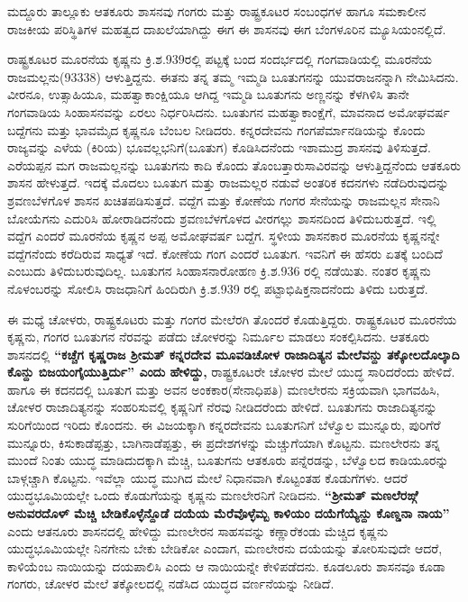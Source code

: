 ಮದ್ದೂರು ತಾಲ್ಲೂಕು ಆತಕೂರು ಶಾಸನವು ಗಂಗರು ಮತ್ತು ರಾಷ್ಟ್ರಕೂಟರ ಸಂಬಂಧಗಳ ಹಾಗೂ ಸಮಕಾಲೀನ ರಾಜಕೀಯ ಪರಿಸ್ಥಿತಿಗಳ ಮಹತ್ವದ ದಾಖಲೆಯಾಗಿದ್ದು ಈಗ ಈ ಶಾಸನವು ಈಗ ಬೆಂಗಳೂರಿನ ಮ್ಯೂಸಿಯಂನಲ್ಲಿದೆ.

ರಾಷ್ಟ್ರಕೂಟರ ಮೂರನೆಯ ಕೃಷ್ಣನು ಕ್ರಿ.ಶ.939ರಲ್ಲಿ ಪಟ್ಟಕ್ಕೆ ಬಂದ ಸಂದರ್ಭದಲ್ಲಿ ಗಂಗವಾಡಿಯಲ್ಲಿ ಮೂರನೆಯ ರಾಜಮಲ್ಲನು(933\enginline{-}38) ಆಳುತ್ತಿದ್ದನು. ಈತನು ತನ್ನ ತಮ್ಮ ಇಮ್ಮಡಿ ಬೂತುಗನನ್ನು ಯುವರಾಜನನ್ನಾಗಿ ನೇಮಿಸಿದನು. ವೀರನೂ, ಉತ್ಸಾಹಿಯೂ, ಮಹತ್ವಾಕಾಂಕ್ಷಿಯೂ ಆಗಿದ್ದ ಇಮ್ಮಡಿ ಬೂತುಗನು ಅಣ್ಣನನ್ನು ಕೆಳಗಿಳಿಸಿ ತಾನೇ ಗಂಗವಾಡಿಯ ಸಿಂಹಾಸನವನ್ನು ಏರಲು ನಿರ್ಧರಿಸಿದನು. ಬೂತುಗನ ಮಹತ್ವಾಕಾಂಕ್ಷೆಗೆ, ಮಾವನಾದ ಅಮೋಘವರ್ಷ ಬದ್ದೆಗನು ಮತ್ತು ಭಾವಮೈದ ಕೃಷ್ಣನೂ ಬೆಂಬಲ ನೀಡಿದರು. ಕನ್ನರದೇವನು ಗಂಗಪೆರ್ಮಾನಡಿಯನ್ನು ಕೊಂದು ರಾಜ್ಯವನ್ನು ಎಳೆಯ (ಕಿರಿಯ) ಭೂವಲ್ಲಭನಿಗೆ(ಬೂತುಗ) ಕೊಡಿಸಿದನೆಂದು ಇಶಾಮುದ್ರ ಶಾಸನವು ತಿಳಿಸುತ್ತದೆ. ಎರೆಯಪ್ಪನ ಮಗ ರಾಜಮಲ್ಲನನ್ನು ಬೂತುಗನು ಕಾದಿ ಕೊಂದು ತೊಂಬತ್ತಾರುಸಾವಿರವನ್ನು ಆಳುತ್ತಿದ್ದನೆಂದು ಆತಕೂರು ಶಾಸನ ಹೇಳುತ್ತದೆ. ಇದಕ್ಕೆ ಮೊದಲು ಬೂತುಗ ಮತ್ತು ರಾಜಮಲ್ಲರ ನಡುವೆ ಅಂತರಿಕ ಕದನಗಳು ನಡೆದಿರುವುದನ್ನು ಶ್ರವಣಬೆಳಗೊಳ ಶಾಸನ ಖಚಿತಪಡಿಸುತ್ತದೆ. ವದ್ದೆಗ ಮತ್ತು ಕೋಣೆಯ ಗಂಗರ ಸೇನೆಯನ್ನು ರಾಜಮಲ್ಲನ ಸೇನಾನಿ ಬೋಯೆಗನು ಎದುರಿಸಿ ಹೋರಾಡಿದನೆಂದು ಶ್ರವಣಬೆಳಗೊಳದ ವೀರಗಲ್ಲು ಶಾಸನದಿಂದ ತಿಳಿದುಬರುತ್ತದೆ. ಇಲ್ಲಿ ವದ್ದೆಗ ಎಂದರೆ ಮೂರನೆಯ ಕೃಷ್ಣನ ಅಪ್ಪ ಅಮೋಘವರ್ಷ ಬದ್ದೆಗ. ಸ್ಥಳೀಯ ಶಾಸನಕಾರ ಮೂರನೆಯ ಕೃಷ್ಣನನ್ನೇ ವದ್ದೆಗನೆಂದು ಕರೆದಿರುವ ಸಾಧ್ಯತೆ ಇದೆ. ಕೋಣೆಯ ಗಂಗ ಎಂದರೆ ಬೂತುಗ. ಇವನಿಗೆ ಈ ಹೆಸರು ಏತಕ್ಕೆ ಬಂದಿದೆ ಎಂಬುದು ತಿಳಿದುಬರುವುದಿಲ್ಲ. ಬೂತುಗನ ಸಿಂಹಾಸನಾರೋಹಣ ಕ್ರಿ.ಶ.936 ರಲ್ಲಿ ನಡೆಯಿತು. ನಂತರ ಕೃಷ್ಣನು ನೊಳಂಬರನ್ನು ಸೋಲಿಸಿ ರಾಜಧಾನಿಗೆ ಹಿಂದಿರುಗಿ ಕ್ರಿ.ಶ.939 ರಲ್ಲಿ ಪಟ್ಟಾಭಿಷಿಕ್ತನಾದನೆಂದು ತಿಳಿದು ಬರುತ್ತದೆ.

ಈ ಮಧ್ಯೆ ಚೋಳರು, ರಾಷ್ಟ್ರಕೂಟರು ಮತ್ತು ಗಂಗರ ಮೇಲೆರಗಿ ತೊಂದರೆ ಕೊಡುತ್ತಿದ್ದರು. ರಾಷ್ಟ್ರಕೂಟರ ಮೂರನೆಯ ಕೃಷ್ಣನು, ಗಂಗರ ಬೂತುಗನ ನೆರವನ್ನು ಪಡೆದು ಚೋಳರನ್ನು ನಿರ್ಮೂಲ ಮಾಡಲು ಸಂಕಲ್ಪಿಸಿದನು. ಆತಕೂರು ಶಾಸನದಲ್ಲಿ \textbf{“ಕಚ್ಚೆಗ ಕೃಷ್ಣರಾಜ ಶ‍್ರೀಮತ್​ ಕನ್ನರದೇವ ಮೂವಡಿಚೋಳ ರಾಜಾದಿತ್ಯನ ಮೇಲೆವನ್ದು ತಕ್ಕೋಲದೊಲ್ಕಾದಿ ಕೊನ್ದು ಬಿಜಯಂಗೈಯುತ್ತಿರ್ದು” ಎಂದು ಹೇಳಿದ್ದು, }ರಾಷ್ಟ್ರಕೂಟರೇ ಚೋಳರ ಮೇಲೆ ಯುದ್ಧ ಸಾರಿದರೆಂದು ಹೇಳಿದೆ. ಹಾಗೂ ಈ ಕದನದಲ್ಲಿ ಬೂತುಗ ಮತ್ತು ಅವನ ಅಂಕಕಾರ(ಸೇನಾಧಿಪತಿ) ಮಣಲೇರನು ಸಕ್ರಿಯವಾಗಿ ಭಾಗವಹಿಸಿ, ಚೋಳರ ರಾಜಾದಿತ್ಯನನ್ನು ಸಂಹರಿಸುವಲ್ಲಿ ಕೃಷ್ಣನಿಗೆ ನೆರವು ನೀಡಿದರೆಂದು ಹೇಳಿದೆ. ಬೂತುಗನು ರಾಜಾದಿತ್ಯನನ್ನು ಸುರಿಗೆಯಿಂದ ಇರಿದು ಕೊಂದನು. ಈ ವಿಜಯಕ್ಕಾಗಿ ಕನ್ನರದೇವನು ಬೂತುಗನಿಗೆ ಬೆಳ್ವೊಲ ಮುನ್ನೂರು, ಪುರಿಗೆರೆ ಮುನ್ನೂರು, ಕಿಸುಕಾಡೆಪ್ಪತ್ತು, ಬಾಗಿನಾಡೆಪ್ಪತ್ತು, ಈ ಪ್ರದೇಶಗಳನ್ನು ಮೆಚ್ಚುಗೆಯಾಗಿ ಕೊಟ್ಟನು. ಮಣಲೇರನು ತನ್ನ ಮುಂದೆ ನಿಂತು ಯುದ್ಧ ಮಾಡಿದುದಕ್ಕಾಗಿ ಮೆಚ್ಚಿ, ಬೂತುಗನು ಆತಕೂರು ಪನ್ನೆರಡನ್ನು, ಬೆಳ್ವೊಲದ ಕಾಡಿಯೂರನ್ನು ಬಾಳ್ಗಚ್ಚಾಗಿ ಕೊಟ್ಟನು. ಇವೆಲ್ಲಾ ಯುದ್ಧ ಮುಗಿದ ಮೇಲೆ ನಿಧಾನವಾಗಿ ಕೊಟ್ಟಂತಹ ಕೊಡುಗೆಗಳು. ಆದರೆ ಯುದ್ಧಭೂಮಿಯಲ್ಲೇ ಒಂದು ಕೊಡುಗೆಯನ್ನು ಕೃಷ್ಣನು ಮಣಲೇರನಿಗೆ ನೀಡಿದನು. \textbf{“ಶ‍್ರೀಮತ್​ ಮಣಲೆರಙ್ಗೆ ಅನುವರದೊಳ್​ ಮೆಚ್ಚಿ ಬೇಡಿಕೊಳ್ಳೆನ್ದೊಡೆ ದಯೆಯ ಮೆರೆವೊಳ್ಳೆಮ್ಬ ಕಾಳಿಯಂ ದಯೆಗೆಯ್ಯೆನ್ದು ಕೊಣ್ಡನಾ ನಾಯ”} ಎಂದು ಆತನೂರು ಶಾಸನದಲ್ಲಿ ಹೇಳಿದ್ದು ಮಣಲೇರನ ಸಾಹಸವನ್ನು ಕಣ್ಣಾರೆಕಂಡು ಮೆಚ್ಚಿದ ಕೃಷ್ಣನು ಯುದ್ಧಭೂಮಿಯಲ್ಲೇ ನಿನಗೇನು ಬೇಕು ಬೇಡಿಕೋ ಎಂದಾಗ, ಮಣಲೇರನು ದಯೆಯನ್ನು ತೋರಿಸುವುದೇ ಆದರೆ, ಕಾಳಿಯೆಂಬ ನಾಯಿಯನ್ನು ದಯಪಾಲಿಸಿ ಎಂದು ಆ ನಾಯಿಯನ್ನೇ ಕೇಳಿಪಡೆದನು. ಕೂಡಲೂರು ಶಾಸನವೂ ಕೂಡಾ ಗಂಗರು, ಚೋಳರ ಮೇಲೆ ತಕ್ಕೋಲದಲ್ಲಿ ನಡೆಸಿದ ಯುದ್ಧದ ವರ್ಣನೆಯನ್ನು ನೀಡಿದೆ.

